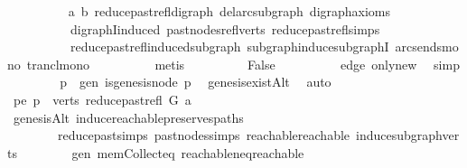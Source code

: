 \begin{isabellebody}
\ \ \ \ \ \ \ \ \isamarkupfalse%
\ a\ b\ reduce{\isacharunderscore}{\kern0pt}past{\isacharunderscore}{\kern0pt}refl{\isacharunderscore}{\kern0pt}digraph\ del{\isacharunderscore}{\kern0pt}arc{\isacharunderscore}{\kern0pt}subgraph\ digraph{\isacharunderscore}{\kern0pt}axioms\isanewline
\ \ \ \ \ \ \ \ \ \ digraphI{\isacharunderscore}{\kern0pt}induced\ past{\isacharunderscore}{\kern0pt}nodes{\isacharunderscore}{\kern0pt}refl{\isacharunderscore}{\kern0pt}verts\ reduce{\isacharunderscore}{\kern0pt}past{\isacharunderscore}{\kern0pt}refl{\isachardot}{\kern0pt}simps\isanewline
\ \ \ \ \ \ \ \ \ \ reduce{\isacharunderscore}{\kern0pt}past{\isacharunderscore}{\kern0pt}refl{\isacharunderscore}{\kern0pt}induced{\isacharunderscore}{\kern0pt}subgraph\ subgraph{\isacharunderscore}{\kern0pt}induce{\isacharunderscore}{\kern0pt}subgraphI\ arcs{\isacharunderscore}{\kern0pt}ends{\isacharunderscore}{\kern0pt}mono\ trancl{\isacharunderscore}{\kern0pt}mono\isanewline
\ \ \ \ \ \ \ \ \isamarkupfalse%
\ metis\isanewline
\ \ \ \ \ \ \isamarkupfalse%
\ \isamarkupfalse%
\ False\isanewline
\ \ \ \ \ \ \ \ \isamarkupfalse%
\ edge\ only{\isacharunderscore}{\kern0pt}new\ \isamarkupfalse%
\ simp\isanewline
\ \ \isamarkupfalse%
\isanewline
\ \ \ \ \isamarkupfalse%
\ p\ \ gen{\isacharcolon}{\kern0pt}\ {\isachardoublequoteopen}is{\isacharunderscore}{\kern0pt}genesis{\isacharunderscore}{\kern0pt}node\ p{\isachardoublequoteclose}\ \isamarkupfalse%
\ genesis{\isacharunderscore}{\kern0pt}existAlt\ \isamarkupfalse%
\ auto\isanewline
\ \ \ \ \isamarkupfalse%
\ pe{\isacharcolon}{\kern0pt}\ {\isachardoublequoteopen}p\ {\isasymin}\ verts\ {\isacharparenleft}{\kern0pt}reduce{\isacharunderscore}{\kern0pt}past{\isacharunderscore}{\kern0pt}refl\ G\ a{\isacharparenright}{\kern0pt}{\isachardoublequoteclose}\isanewline
\ \ \ \ \ \ \isamarkupfalse%
\ genesisAlt\ induce{\isacharunderscore}{\kern0pt}reachable{\isacharunderscore}{\kern0pt}preserves{\isacharunderscore}{\kern0pt}paths\isanewline
\ \ \ \ \ \ \ \ reduce{\isacharunderscore}{\kern0pt}past{\isachardot}{\kern0pt}simps\ past{\isacharunderscore}{\kern0pt}nodes{\isachardot}{\kern0pt}simps\ reachable{}{\isacharunderscore}{\kern0pt}reachable\ induce{\isacharunderscore}{\kern0pt}subgraph{\isacharunderscore}{\kern0pt}verts\isanewline
\ \ \ \ \ \ \ \ gen\ mem{\isacharunderscore}{\kern0pt}Collect{\isacharunderscore}{\kern0pt}eq\ reachable{\isacharunderscore}{\kern0pt}neq{\isacharunderscore}{\kern0pt}reachable{}\isanewline

\end{isabellebody}
